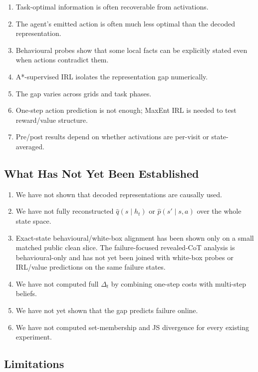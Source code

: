 \documentclass[11pt,a4paper]{article}
\newcommand{\qhat}{\hat q}
\newcommand{\phat}{\hat p}
\begin{document}
\begin{enumerate}[leftmargin=*]
\item Task-optimal information is often recoverable from activations.
\item The agent's emitted action is often much less optimal than the decoded representation.
\item Behavioural probes show that some local facts can be explicitly stated even when actions contradict them.
\item A*-supervised IRL isolates the representation gap numerically.
\item The gap varies across grids and task phases.
\item One-step action prediction is not enough; MaxEnt IRL is needed to test reward/value structure.
\item Pre/post results depend on whether activations are per-visit or state-averaged.
\end{enumerate}

\subsection{What Has Not Yet Been Established}

\begin{enumerate}[leftmargin=*]
\item We have not shown that decoded representations are causally used.
\item We have not fully reconstructed $\qhat(s\mid h_t)$ or $\phat(s'\mid s,a)$ over the whole state space.
\item Exact-state behavioural/white-box alignment has been shown only on a small matched public clean slice. The failure-focused revealed-CoT analysis is behavioural-only and has not yet been joined with white-box probes or IRL/value predictions on the same failure states.
\item We have not computed full $\Delta_t$ by combining one-step costs with multi-step beliefs.
\item We have not yet shown that the gap predicts failure online.
\item We have not computed set-membership and JS divergence for every existing experiment.
\end{enumerate}

\subsection{Limitations}
\end{document}
